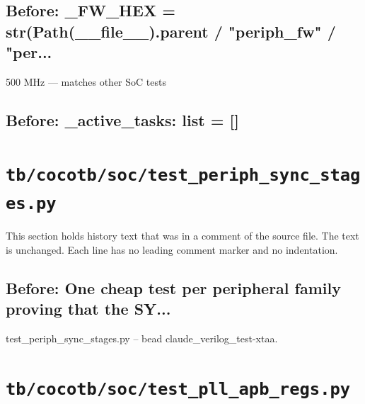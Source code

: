 \begin{record}

\subsection*{Before: \_FW\_HEX = str(Path(\_\_file\_\_).parent / "periph\_fw" / "per...}

\begin{textblock}
500 MHz — matches other SoC tests
\end{textblock}

\subsection*{Before: \_active\_tasks: list = []}


\end{record}

\section{\texttt{tb/cocotb/soc/test\_periph\_sync\_stages.py}}\label{cr:suite:soc-test-periph-sync-stages}

This section holds history text that was in a comment of the source file. The text is unchanged. Each line has no leading comment marker and no indentation.

\begin{record}

\subsection*{Before: One cheap test per peripheral family proving that the SY...}

\begin{textblock}
test_periph_sync_stages.py -- bead claude_verilog_test-xtaa.
\end{textblock}

\end{record}

\section{\texttt{tb/cocotb/soc/test\_pll\_apb\_regs.py}}\label{cr:suite:soc-test-pll-apb-regs}

